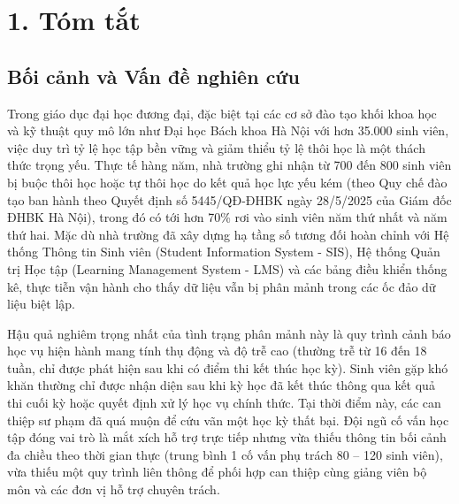 \section*{1. Tóm tắt}

\subsection*{Bối cảnh và Vấn đề nghiên cứu}
Trong giáo dục đại học đương đại, đặc biệt tại các cơ sở đào tạo khối khoa học và kỹ thuật quy mô lớn như Đại học Bách khoa Hà Nội với hơn 35.000 sinh viên, việc duy trì tỷ lệ học tập bền vững và giảm thiểu tỷ lệ thôi học là một thách thức trọng yếu. Thực tế hàng năm, nhà trường ghi nhận từ 700 đến 800 sinh viên bị buộc thôi học hoặc tự thôi học do kết quả học lực yếu kém (theo Quy chế đào tạo ban hành theo Quyết định số 5445/QĐ-ĐHBK ngày 28/5/2025 của Giám đốc ĐHBK Hà Nội), trong đó có tới hơn 70\% rơi vào sinh viên năm thứ nhất và năm thứ hai. Mặc dù nhà trường đã xây dựng hạ tầng số tương đối hoàn chỉnh với Hệ thống Thông tin Sinh viên (Student Information System - SIS), Hệ thống Quản trị Học tập (Learning Management System - LMS) và các bảng điều khiển thống kê, thực tiễn vận hành cho thấy dữ liệu vẫn bị phân mảnh trong các ốc đảo dữ liệu biệt lập.

Hậu quả nghiêm trọng nhất của tình trạng phân mảnh này là quy trình cảnh báo học vụ hiện hành mang tính thụ động và độ trễ cao (thường trễ từ 16 đến 18 tuần, chỉ được phát hiện sau khi có điểm thi kết thúc học kỳ). Sinh viên gặp khó khăn thường chỉ được nhận diện sau khi kỳ học đã kết thúc thông qua kết quả thi cuối kỳ hoặc quyết định xử lý học vụ chính thức. Tại thời điểm này, các can thiệp sư phạm đã quá muộn để cứu vãn một học kỳ thất bại. Đội ngũ cố vấn học tập đóng vai trò là mắt xích hỗ trợ trực tiếp nhưng vừa thiếu thông tin bối cảnh đa chiều theo thời gian thực (trung bình 1 cố vấn phụ trách 80 -- 120 sinh viên), vừa thiếu một quy trình liên thông để phối hợp can thiệp cùng giảng viên bộ môn và các đơn vị hỗ trợ chuyên trách.

